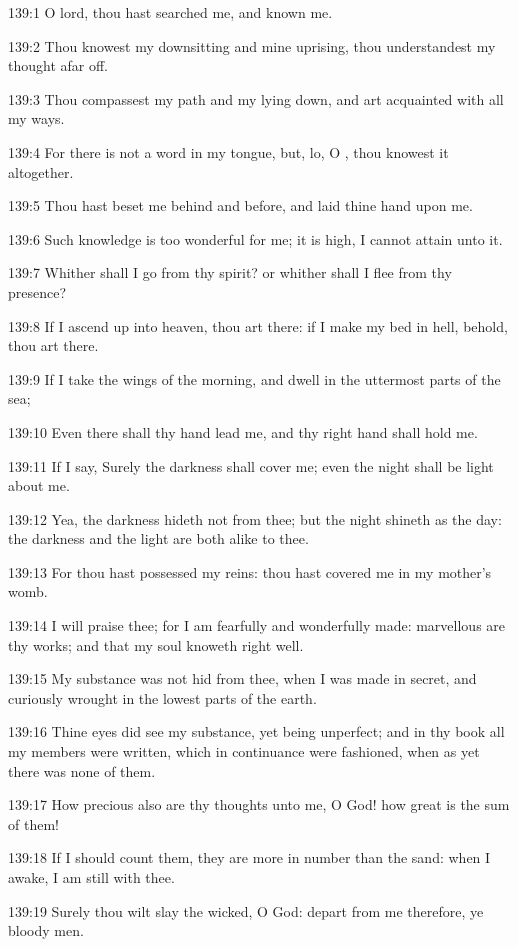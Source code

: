 139:1 O lord, thou hast searched me, and known me.

139:2 Thou knowest my downsitting and mine uprising, thou
understandest my thought afar off.

139:3 Thou compassest my path and my lying down, and art acquainted
with all my ways.

139:4 For there is not a word in my tongue, but, lo, O \LORD, thou
knowest it altogether.

139:5 Thou hast beset me behind and before, and laid thine hand upon
me.

139:6 Such knowledge is too wonderful for me; it is high, I cannot
attain unto it.

139:7 Whither shall I go from thy spirit? or whither shall I flee from
thy presence?

139:8 If I ascend up into heaven, thou art there: if I make my bed in
hell, behold, thou art there.

139:9 If I take the wings of the morning, and dwell in the uttermost
parts of the sea;

139:10 Even there shall thy hand lead me, and thy right hand shall
hold me.

139:11 If I say, Surely the darkness shall cover me; even the night
shall be light about me.

139:12 Yea, the darkness hideth not from thee; but the night shineth
as the day: the darkness and the light are both alike to thee.

139:13 For thou hast possessed my reins: thou hast covered me in my
mother's womb.

139:14 I will praise thee; for I am fearfully and wonderfully made:
marvellous are thy works; and that my soul knoweth right well.

139:15 My substance was not hid from thee, when I was made in secret,
and curiously wrought in the lowest parts of the earth.

139:16 Thine eyes did see my substance, yet being unperfect; and in
thy book all my members were written, which in continuance were
fashioned, when as yet there was none of them.

139:17 How precious also are thy thoughts unto me, O God! how great is
the sum of them!

139:18 If I should count them, they are more in number than the sand:
when I awake, I am still with thee.

139:19 Surely thou wilt slay the wicked, O God: depart from me
therefore, ye bloody men.

